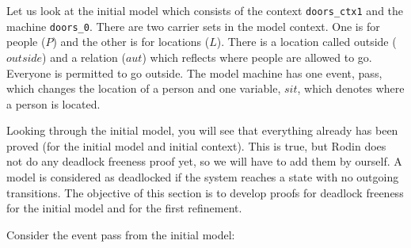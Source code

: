 

Let us look at the initial model which consists of the context \texttt{doors\_ctx1} and the machine \texttt{doors\_0}. There are two carrier sets in the model context. One is for people ($P$) and the other is for locations ($L$). There is a location called outside ($outside$) and a relation ($aut$) which reflects where people are allowed to go. Everyone is permitted to go outside. The model machine has one event, \textsf{pass}, which changes the location of a person and one variable, $sit$, which denotes where a person is located. 


Looking through the initial model, you will see that everything already has been proved (for the initial model and initial context). This is true, but Rodin does not do any deadlock freeness proof yet, so we will have to add them by ourself. A model is considered as deadlocked if the system reaches a state with no outgoing transitions. The objective of this section is to develop proofs for deadlock freeness for the initial model and for the first refinement. 

Consider the event \textsf{pass} from the initial model:


